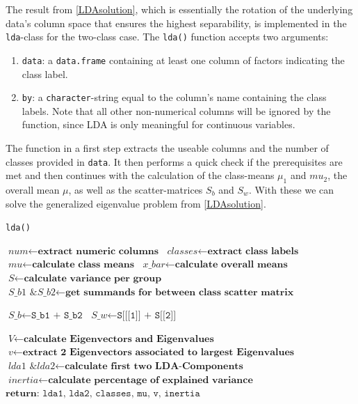\documentclass{article}
\begin{document}
The result from \ref{LDAsolution}, which is essentially the rotation of the underlying data's column space that ensures the highest separability, is implemented in the \texttt{lda}-class for the two-class case. The \texttt{lda()} function accepts two arguments:

\begin{enumerate}
\item \texttt{data}: a \texttt{data.frame} containing at least one column of factors indicating the class label.
\item \texttt{by}: a \texttt{character}-string equal to the column's name containing the class labels. Note that all other non-numerical columns will be ignored by the function, since LDA is only meaningful for continuous variables.
\end{enumerate} 

The function in a first step extracts the useable columns and the number of classes provided in \texttt{data}. It then performs a quick check if the prerequisites are met and then continues with the calculation of the class-means $\mu_1$ and $mu_2$, the overall mean $\mu$, as well as the scatter-matrices $S_b$ and $S_w$. With these we can solve the generalized eigenvalue problem from \ref{LDAsolution}.

\begin{algorithm}
\caption{\texttt{lda()}} \label{lda-function}
\begin{algorithmic}[1]
\State $\textit{num} \gets \textbf{extract numeric columns}$
\State $\textit{classes} \gets \textbf{extract class labels}$
\State $\textit{mu} \gets \textbf{calculate class means}$
\State $\textit{x\_bar} \gets \textbf{calculate overall means}$
\State $\textit{S} \gets \textbf{calculate variance per group}$
\State $\textit{S\_b1 \& S\_b2} \gets \textbf{get summands for between class scatter matrix}$
\EndProcedure

\State $\textit{S\_b} \gets \texttt{S\_b1 + S\_b2}$
\State $\textit{S\_w} \gets \texttt{S[[[1]] + S[[2]]}$
\EndProcedure

\State $\textit{V} \gets \textbf{calculate Eigenvectors and Eigenvalues}$
\State $\textit{v} \gets \textbf{extract 2 Eigenvectors associated to largest Eigenvalues}$
\State $\textit{lda1 \& lda2} \gets \textbf{calculate first two LDA-Components}$
\State $\textit{inertia} \gets \textbf{calculate percentage of explained variance}$
\State $\textbf{return: } \texttt{lda1, lda2, classes, mu, v, inertia}$
\EndProcedure

\end{algorithmic}
\end{algorithm}
\end{document}

